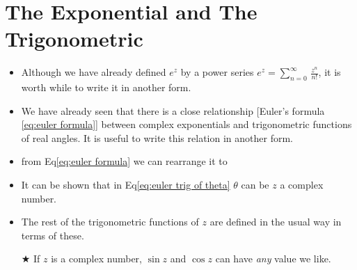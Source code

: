        \section{The Exponential and The Trigonometric}
            \begin{itemize}
                \item Although we have already defined $e^z$ by a power series $e^z=\sum_{n=0}^\infty \, \frac{z^n}{n!}$, 
                it is worth while to write it in another form.
                \item We have already seen that there is a close relationship [Euler’s formula \eqref{eq:euler formula}]
                between complex exponentials and trigonometric functions of real angles. It is useful 
                to write this relation in another form.
                \item from Eq\eqref{eq:euler formula} we can rearrange it to
                \item It can be shown that in Eq\eqref{eq:euler trig of theta} $\theta$ can be $z$ a complex number.
                \item The rest of the trigonometric functions of $z$ are defined in the usual way in terms of these.
                
                $\bigstar$ If $z$ is a complex number, $\sin{z}$ and $\cos{z}$ can have \textit{any} value we like.
            \end{itemize}


